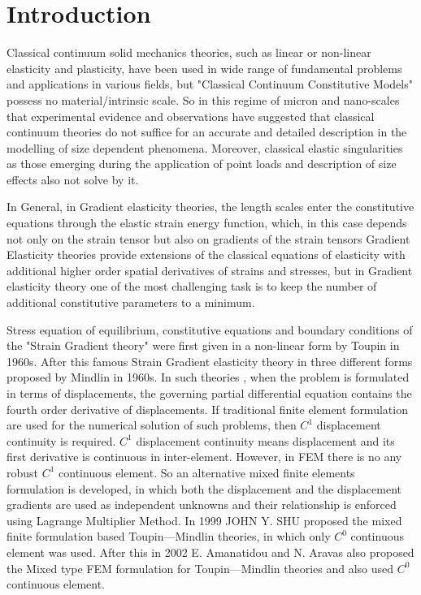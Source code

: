 \documentclass[12pt]{article}
\begin{document}
    \newpage
    	\listoffigures
    	\listoftables
    \clearpage
    \tableofcontents
    \clearpage

\section{Introduction}
Classical continuum solid mechanics theories, such as linear or non-linear elasticity and plasticity, have been used in wide range of fundamental problems and applications in various fields, but "Classical Continuum Constitutive Models" possess no material/intrinsic scale. So in this regime of micron and nano-scales that experimental evidence and observations have suggested that classical continuum theories do not suffice for an accurate and detailed description in the modelling of size dependent phenomena. Moreover, classical elastic singularities as those emerging during the application of point loads and description of size effects also not solve by it.
\newline
\par
In General, in Gradient elasticity theories, the length scales enter the constitutive equations through the elastic strain energy function, which, in this case depends not only on the strain tensor but also on gradients of the strain tensors Gradient Elasticity theories provide extensions of the classical equations of elasticity with additional higher order spatial derivatives of strains and stresses, but in Gradient elasticity theory one of the most challenging task is to keep the number of additional constitutive parameters to a minimum.
\newline
\par
Stress equation of equilibrium, constitutive equations and boundary conditions of the "Strain Gradient theory" were first given in a non-linear form by Toupin in 1960s. After this famous Strain Gradient elasticity theory in three different forms proposed by Mindlin in 1960s. In such theories , when the problem is formulated in terms of displacements, the governing partial differential equation contains the fourth order derivative of displacements. If traditional finite element formulation are used for the numerical solution of such problems, then $C^{1}$ displacement continuity is required. $C^{1}$ displacement continuity means displacement and its first derivative is continuous in inter-element. However, in FEM there is no any robust $C^{1}$ continuous element. So an alternative mixed finite elements formulation is developed, in which both the displacement and the displacement gradients are used as independent unknowns and their relationship is enforced using Lagrange Multiplier Method. In 1999 JOHN Y. SHU proposed the mixed finite formulation based Toupin—Mindlin theories, in which only $C^{0}$ continuous element was used. After this in 2002 E. Amanatidou and N. Aravas also proposed the Mixed type FEM formulation for Toupin—Mindlin theories and also used $C^{0}$ continuous element.
\end{document}
